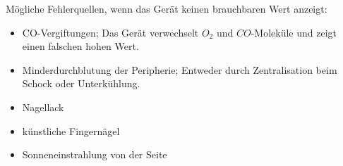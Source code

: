 Mögliche Fehlerquellen, wenn das Gerät keinen brauchbaren Wert anzeigt:
\begin{itemize}
	\item CO-Vergiftungen; Das Gerät verwechselt $O_2$ und
	$CO$-Moleküle und zeigt einen falschen hohen Wert.
	\item Minderdurchblutung der Peripherie; Entweder durch Zentralisation beim Schock oder Unterkühlung.
	\item Nagellack
	\item künstliche Fingernägel
	\item Sonneneinstrahlung von der Seite
\end{itemize}



